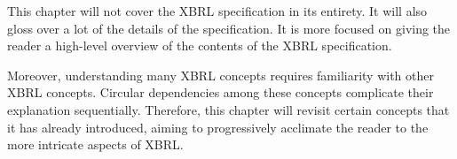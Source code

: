 This chapter will not cover the XBRL specification in its entirety.
It will also gloss over a lot of the details of the specification.
It is more focused on giving the reader a high-level overview of the contents of the XBRL specification.

Moreover, understanding many XBRL concepts requires familiarity with other XBRL concepts.
Circular dependencies among these concepts complicate their explanation sequentially.
Therefore, this chapter will revisit certain concepts that it has already introduced,
aiming to progressively acclimate the reader to the more intricate aspects of XBRL.
